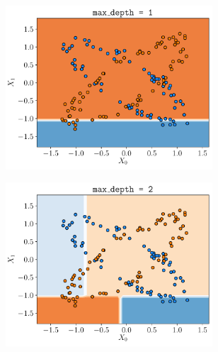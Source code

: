 \documentclass[a4paper, 12pt]{article}
\begin{document}
\begin{enumerate}[label = (\alph*)]
        \begin{figure}[h]
            \centering
            \begin{subfigure}{0.49\textwidth}
                \centering
        	    \includegraphics[width=0.85\textwidth]{resources/pdf/make_data2_depth1.pdf}
            \end{subfigure}
            \begin{subfigure}{0.49\textwidth}
                \centering
        	    \includegraphics[width=0.85\textwidth]{resources/pdf/make_data2_depth2.pdf}
            \end{subfigure}
            \begin{subfigure}{0.49\textwidth}
                \centering

\end{subfigure}
\end{figure}
\end{enumerate}
\end{document}
